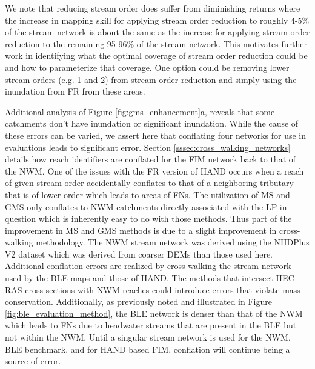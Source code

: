We note that reducing stream order does suffer from diminishing returns where the increase in mapping skill for applying stream order reduction to roughly 4-5\% of the stream network is about the same as the increase for applying stream order reduction to the remaining 95-96\% of the stream network.
This motivates further work in identifying what the optimal coverage of stream order reduction could be and how to parameterize that coverage. 
One option could be removing lower stream orders (e.g. 1 and 2) from stream order reduction and simply using the inundation from FR from these areas.

Additional analysis of Figure \ref{fig:gms_enhancement}a, reveals that some catchments don't have inundation or significant inundation.
While the cause of these errors can be varied, we assert here that conflating four networks for use in evaluations leads to significant error.
Section \ref{sssec:cross_walking_networks} details how reach identifiers are conflated for the FIM network back to that of the NWM. 
One of the issues with the FR version of HAND occurs when a reach of given stream order accidentally conflates to that of a neighboring tributary that is of lower order which leads to areas of FNs.
The utilization of MS and GMS only conflates to NWM catchments directly associated with the LP in question which is inherently easy to do with those methods. 
Thus part of the improvement in MS and GMS methods is due to a slight improvement in cross-walking methodology.
The NWM stream network was derived using the NHDPlus V2 dataset which was derived from coarser DEMs than those used here. 
Additional conflation errors are realized by cross-walking the stream network used by the BLE maps and those of HAND.
The methods that intersect HEC-RAS cross-sections with NWM reaches could introduce errors that violate mass conservation.
Additionally, as previously noted and illustrated in Figure \ref{fig:ble_evaluation_method}, the BLE network is denser than that of the NWM which leads to FNs due to headwater streams that are present in the BLE but not within the NWM.
Until a singular stream network is used for the NWM, BLE benchmark, and for HAND based FIM, conflation will continue being a source of error.

